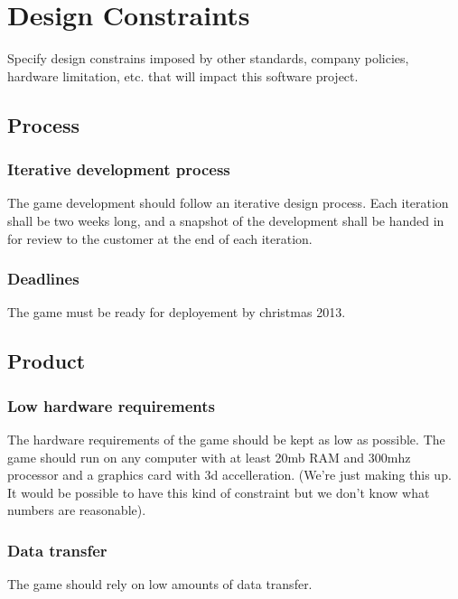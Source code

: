 
\section{Design Constraints}
Specify design constrains imposed by other standards, company policies, hardware limitation, etc. that will impact this software project.

\subsection{Process}
\subsubsection{Iterative development process}
The game development should follow an iterative design process. Each iteration shall be two weeks long, and a snapshot of the development shall be handed in for review to the customer at the end of each iteration.



\subsubsection{Deadlines}
The game must be ready for deployement by christmas 2013.



\subsection{Product}
\subsubsection{Low hardware requirements}
\label{hwreq}
The hardware requirements of the game should be kept as low as possible. The game should run on any computer with at least 20mb RAM and 300mhz processor and a graphics card with 3d accelleration. (We're just making this up. It would be possible to have this kind of constraint but we don't know what numbers are reasonable).



\subsubsection{Data transfer}
The game should rely on low amounts of data transfer.

